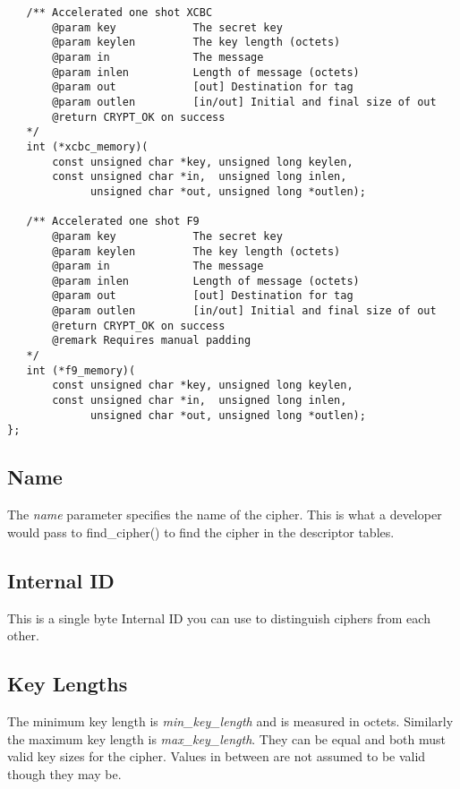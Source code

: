 \documentclass[synpaper]{book}
\begin{document}
\begin{small}
\begin{verbatim}
   /** Accelerated one shot XCBC
       @param key            The secret key
       @param keylen         The key length (octets)
       @param in             The message
       @param inlen          Length of message (octets)
       @param out            [out] Destination for tag
       @param outlen         [in/out] Initial and final size of out
       @return CRYPT_OK on success
   */
   int (*xcbc_memory)(
       const unsigned char *key, unsigned long keylen,
       const unsigned char *in,  unsigned long inlen,
             unsigned char *out, unsigned long *outlen);

   /** Accelerated one shot F9
       @param key            The secret key
       @param keylen         The key length (octets)
       @param in             The message
       @param inlen          Length of message (octets)
       @param out            [out] Destination for tag
       @param outlen         [in/out] Initial and final size of out
       @return CRYPT_OK on success
       @remark Requires manual padding
   */
   int (*f9_memory)(
       const unsigned char *key, unsigned long keylen,
       const unsigned char *in,  unsigned long inlen,
             unsigned char *out, unsigned long *outlen);
};
\end{verbatim}
\end{small}

\subsection{Name}
The \textit{name} parameter specifies the name of the cipher.  This is what a developer would pass to find\_cipher() to find the cipher in the descriptor
tables.

\subsection{Internal ID}
This is a single byte Internal ID you can use to distinguish ciphers from each other.

\subsection{Key Lengths}
The minimum key length is \textit{min\_key\_length} and is measured in octets.  Similarly the maximum key length is \textit{max\_key\_length}.  They can be equal
and both must valid key sizes for the cipher.  Values in between are not assumed to be valid though they may be.
\end{document}
